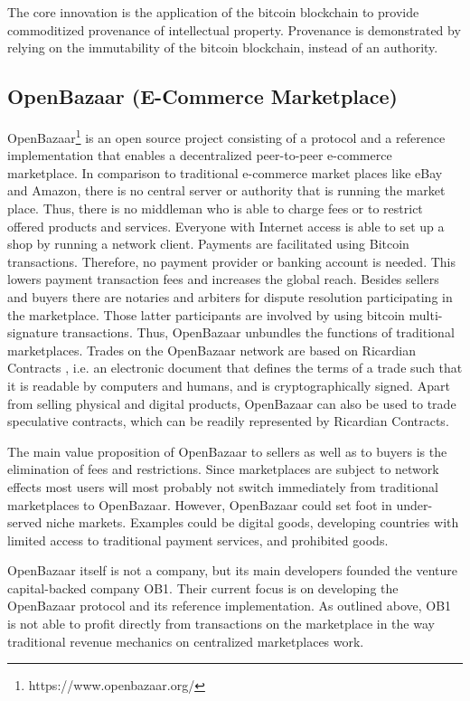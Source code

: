 The core innovation is the application of the bitcoin blockchain to provide commoditized 
provenance of intellectual property. Provenance is demonstrated by relying on the 
immutability of the bitcoin blockchain, instead of an authority. 

\subsection{OpenBazaar (E-Commerce Marketplace)}
\label{sec:ecobazaar}

OpenBazaar\footnote{https://www.openbazaar.org/} is an open source project consisting of a protocol and a reference 
implementation that enables a decentralized peer-to-peer e-commerce marketplace. 
In comparison to traditional e-commerce market places like eBay and Amazon, there 
is no central server or authority that is running the market place. Thus, there 
is no middleman who is able to charge fees or to restrict offered products and 
services. Everyone with Internet access is able to set up a shop by running a network 
client. Payments are facilitated using Bitcoin transactions. Therefore, no payment 
provider or banking account is needed. This lowers payment transaction fees and 
increases the global reach. Besides sellers and buyers there are notaries and arbiters 
for dispute resolution participating in the marketplace. Those latter participants 
are involved by using bitcoin multi-signature transactions. Thus, OpenBazaar unbundles 
the functions of traditional marketplaces. Trades on the OpenBazaar network are 
based on Ricardian Contracts \parencite{1319505}, i.e. an electronic document that defines 
the terms of a trade such that it is readable by computers and humans, and is cryptographically 
signed. Apart from selling physical and digital products, OpenBazaar can also be 
used to trade speculative contracts, which can be readily represented by Ricardian 
Contracts. 

The main value proposition of OpenBazaar to sellers as well as to buyers is the 
elimination of fees and restrictions. Since marketplaces are subject to network 
effects most users will most probably not switch immediately from traditional marketplaces 
to OpenBazaar. However, OpenBazaar could set foot in under-served niche markets. 
Examples could be digital goods, developing countries with limited access to traditional 
payment services, and prohibited goods. 

OpenBazaar itself is not a company, but its main developers founded the venture 
capital-backed company OB1. Their current focus is on developing the OpenBazaar 
protocol and its reference implementation. As outlined above, OB1 is not able to 
profit directly from transactions on the marketplace in the way traditional revenue 
mechanics on centralized marketplaces work. 

